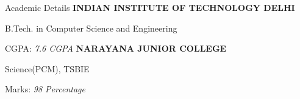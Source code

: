 \begin{rubric}{Academic Details}
%
	\textbf{INDIAN INSTITUTE OF TECHNOLOGY DELHI}\par
    B.Tech. in Computer Science and Engineering
    \par CGPA: \textit{ 7.6 CGPA}
%
%
\entry*[2019 -- 2021]%
	\textbf{NARAYANA JUNIOR COLLEGE} \par
    Science(PCM), TSBIE
    \par Marks: \textit{ 98 Percentage}
%
\end{rubric}
